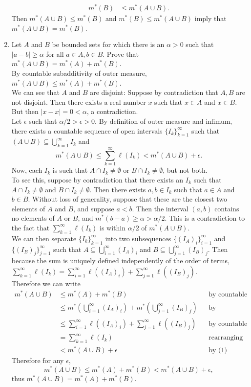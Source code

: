 \begin{enumerate}
	\begin{align*}
		m^*(B)&\le m^*(A\cup B).
	\end{align*}
	Then $m^*(A\cup B)\le m^*(B)$ and $m^*(B)\le m^*(A\cup B)$ imply that $m^*(A\cup B) = m^*(B)$.
	\item Let $A$ and $B$ be bounded sets for which there is an $\alpha >0$ such that $|a-b| \ge \alpha$ for all $a \in A, b \in B$.
	Prove that $m^*(A \cup B) = m^*(A)+m^*(B)$.\\
	By countable subadditivity of outer measure, $m^*(A \cup B) \le m^*(A)+m^*(B)$.\\
	We can see that $A$ and $B$ are disjoint: Suppose by contradiction that $A,B$ are not disjoint. Then there exists a real number $x$ such that $x\in A$ and $x\in B$.
	But then $|x-x|=0<\alpha$, a contradiction.\\
	Let $\epsilon$ such that $\alpha/2>\epsilon>0$. By definition of outer measure and infimum, there exists a countable sequence of open intervals $\{I_k\}_{k=1}^\infty$ such that $(A\cup B)\subseteq\bigcup_{k=1}^\infty I_k$ and 
	\begin{equation}
		m^*(A\cup B)\le\sum_{k=1}^\infty\ell(I_k)<m^*(A\cup B)+\epsilon.\tag{1}	
	\end{equation}
	Now, each $I_k$ is such that $A\cap I_k\neq\emptyset$ or $B\cap I_k\neq\emptyset$, but not both.\\
	To see this, suppose by contradiction that there exists an $I_k$ such that $A\cap I_k\neq\emptyset$ and $B\cap I_k\neq\emptyset$.
	Then there exists $a,b\in I_k$ such that $a\in A$ and $b\in B$.
	Without loss of generality, suppose that these are the closest two elements of $A$ and $B$, and suppose $a<b$. Then the interval $(a,b)$ contains no elements of $A$ or $B$, and $m^*(b-a)\ge\alpha>\alpha/2$.
	This is a contradiction to the fact that $\sum_{k=1}^\infty\ell(I_k)$ is within $\alpha/2$ of $m^*(A\cup B)$.\\
	We can then separate $\{I_k\}_{k=1}^\infty$ into two subsequences $\{(I_A)_i\}_{i=1}^\infty$ and $\{(I_B)_j\}_{j=1}^\infty$ such that $A\subseteq\bigcup_{i=1}^\infty (I_A)_i$ and $B\subseteq\bigcup_{j=1}^\infty (I_B)_j$.
	Then because the sum is uniquely defined independently of the order of terms, $\sum_{k=1}^\infty\ell(I_k)=\sum_{i=1}^\infty\ell((I_A)_i)+\sum_{j=1}^\infty\ell((I_B)_j)$.\\
	Therefore we can write
	\begin{align*}
		m^*(A \cup B)&\le m^*(A)+m^*(B)&&\text{by countable subadditivity of outer measure}\\
		&\le m^*(\bigcup_{i=1}^\infty (I_A)_i)+m^*(\bigcup_{j=1}^\infty (I_B)_j)&&\text{by monotonicity of outer measure}\\
		&\le \sum_{i=1}^\infty\ell((I_A)_i)+\sum_{j=1}^\infty\ell((I_B)_j)&&\text{by countable subadditivity of outer measure}\\
		&=\sum_{k=1}^\infty\ell(I_k)&&\text{rearranging the sum}\\
		&<m^*(A\cup B)+\epsilon&&\text{by (1)}
	\end{align*}
	Therefore for any $\epsilon$,
	\[
		m^*(A \cup B)\le m^*(A)+m^*(B)<m^*(A\cup B)+\epsilon,
	\]
	thus $m^*(A \cup B) = m^*(A)+m^*(B)$.
\end{enumerate}
